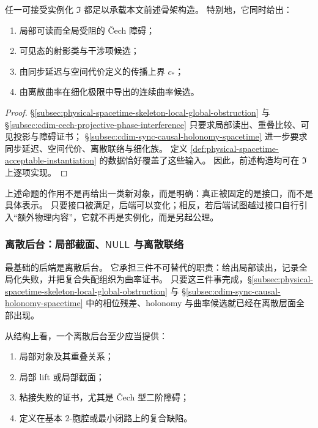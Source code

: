 \begin{proposition}[实例化准则]\label{prop:physical-spacetime-instantiation-criterion}
任一可接受实例化 \(\mathfrak I\) 都足以承载本文前述骨架构造。
特别地，它同时给出：
\begin{enumerate}
  \item 局部可读而全局受阻的 \v{C}ech 障碍；
  \item 可见态的射影类与干涉项候选；
  \item 由同步延迟与空间代价定义的传播上界 \(c_*\)；
  \item 由离散曲率在细化极限中导出的连续曲率候选。
\end{enumerate}
\end{proposition}
\begin{proof}
\S\ref{subsec:physical-spacetime-skeleton-local-global-obstruction} 与 \S\ref{subsec:cdim-cech-projective-phase-interference} 只要求局部读出、重叠比较、可见投影与障碍证书；
\S\ref{subsec:cdim-sync-causal-holonomy-spacetime} 进一步要求同步延迟、空间代价、离散联络与细化族。
定义 \ref{def:physical-spacetime-acceptable-instantiation} 的数据恰好覆盖了这些输入。
因此，前述构造均可在 \(\mathfrak I\) 上逐项实现。
\end{proof}

上述命题的作用不是再给出一类新对象，而是明确：真正被固定的是接口，而不是具体表示。
只要接口被满足，后端可以变化；相反，若后端试图越过接口自行引入“额外物理内容”，它就不再是实例化，而是另起公理。

\subsubsection{离散后台：局部截面、\texorpdfstring{$\mathsf{NULL}$}{NULL} 与离散联络}
最基础的后端是离散后台。
它承担三件不可替代的职责：给出局部读出，记录全局化失败，并把复合失配组织为曲率证书。
只要这三件事完成，\S\ref{subsec:physical-spacetime-skeleton-local-global-obstruction} 与 \S\ref{subsec:cdim-sync-causal-holonomy-spacetime} 中的相位残差、holonomy 与曲率候选就已经在离散层面全部出现。

从结构上看，一个离散后台至少应当提供：
\begin{enumerate}
  \item 局部对象及其重叠关系；
  \item 局部 lift 或局部截面；
  \item 粘接失败的证书，尤其是 \v{C}ech 型二阶障碍；
  \item 定义在基本 \(2\)-胞腔或最小闭路上的复合缺陷。
\end{enumerate}


